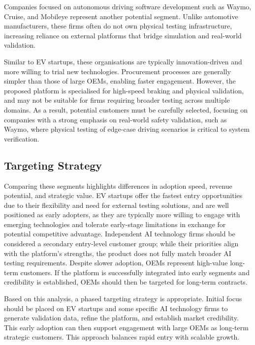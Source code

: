 Companies focused on autonomous driving software development such as Waymo, Cruise, and Mobileye represent another potential segment. Unlike automotive manufacturers, these firms often do not own physical testing infrastructure, increasing reliance on external platforms that bridge simulation and real-world validation.

Similar to EV startups, these organisations are typically innovation-driven and more willing to trial new technologies. Procurement processes are generally simpler than those of large OEMs, enabling faster engagement. However, the proposed platform is specialised for high-speed braking and physical validation, and may not be suitable for firms requiring broader testing across multiple domains. As a result, potential customers must be carefully selected, focusing on companies with a strong emphasis on real-world safety validation, such as Waymo, where physical testing of edge-case driving scenarios is critical to system verification.

\subsection{Targeting Strategy}

Comparing these segments highlights differences in adoption speed, revenue potential, and strategic value. EV startups offer the fastest entry opportunities due to their flexibility and need for external testing solutions, and are well positioned as early adopters, as they are typically more willing to engage with emerging technologies and tolerate early-stage limitations in exchange for potential competitive advantage. Independent AI technology firms should be considered a secondary entry-level customer group; while their priorities align with the platform’s strengths, the product does not fully match broader AI testing requirements. Despite slower adoption, OEMs represent high-value long-term customers. If the platform is successfully integrated into early segments and credibility is established, OEMs should then be targeted for long-term contracts.

Based on this analysis, a phased targeting strategy is appropriate. Initial focus should be placed on EV startups and some specific AI technology firms to generate validation data, refine the platform, and establish market credibility. This early adoption can then support engagement with large OEMs as long-term strategic customers. This approach balances rapid entry with scalable growth.


